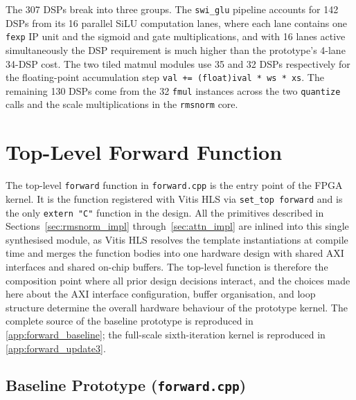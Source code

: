 The 307 DSPs break into three groups. The \texttt{swi\_glu} pipeline
accounts for 142 DSPs from its 16 parallel SiLU computation lanes, where each
lane contains one \texttt{fexp} IP unit and the sigmoid and gate
multiplications, and with 16 lanes active simultaneously the DSP
requirement is much higher than the prototype's 4-lane 34-DSP cost.
The two tiled matmul modules use 35 and 32 DSPs respectively for the
floating-point accumulation step \texttt{val += (float)ival * ws * xs}.
The remaining 130 DSPs come from the 32 \texttt{fmul} instances across
the two \texttt{quantize} calls and the scale multiplications in the
\texttt{rmsnorm} core.

\section{Top-Level Forward Function}
\label{sec:forward_impl}

The top-level \texttt{forward} function in \texttt{forward.cpp} is the
entry point of the FPGA kernel. It is the function registered with
Vitis HLS via \texttt{set\_top forward} and is the only
\texttt{extern~"C"} function in the design. All the primitives
described in Sections~\ref{sec:rmsnorm_impl}
through~\ref{sec:attn_impl} are inlined into this single synthesised
module, as Vitis HLS resolves the template instantiations at compile time
and merges the function bodies into one hardware design with shared
AXI interfaces and shared on-chip buffers. The top-level function is
therefore the composition point where all prior design decisions
interact, and the choices made here about the AXI interface
configuration, buffer organisation, and loop structure determine the
overall hardware behaviour of the prototype kernel. The complete source
of the baseline prototype is reproduced in
\cref{app:forward_baseline}; the full-scale sixth-iteration kernel is
reproduced in \cref{app:forward_update3}.

\subsection{Baseline Prototype (\texttt{forward.cpp})}
\label{subsec:forward_proto_impl}

